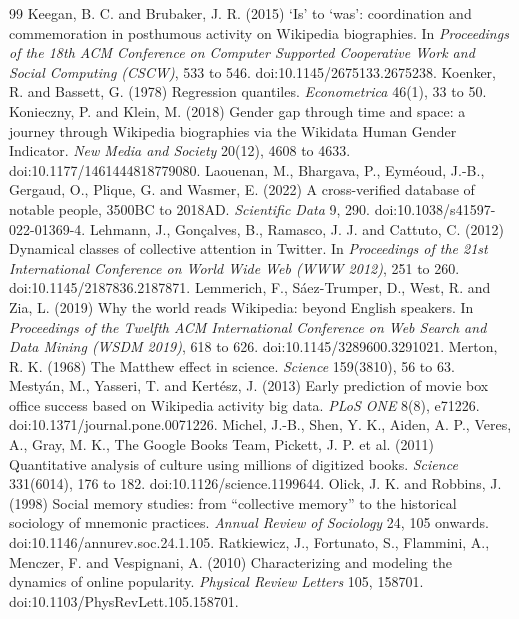\documentclass[11pt,a4paper]{article}
\begin{document}
\begin{thebibliography}{99}
 Keegan, B. C. and Brubaker, J. R. (2015) `Is' to `was': coordination and commemoration in posthumous activity on Wikipedia biographies. In \textit{Proceedings of the 18th ACM Conference on Computer Supported Cooperative Work and Social Computing (CSCW)}, 533 to 546. doi:10.1145/2675133.2675238.
 Koenker, R. and Bassett, G. (1978) Regression quantiles. \textit{Econometrica} 46(1), 33 to 50.
 Konieczny, P. and Klein, M. (2018) Gender gap through time and space: a journey through Wikipedia biographies via the Wikidata Human Gender Indicator. \textit{New Media and Society} 20(12), 4608 to 4633. doi:10.1177/1461444818779080.
 Laouenan, M., Bhargava, P., Eyméoud, J.-B., Gergaud, O., Plique, G. and Wasmer, E. (2022) A cross-verified database of notable people, 3500BC to 2018AD. \textit{Scientific Data} 9, 290. doi:10.1038/s41597-022-01369-4.
 Lehmann, J., Gonçalves, B., Ramasco, J. J. and Cattuto, C. (2012) Dynamical classes of collective attention in Twitter. In \textit{Proceedings of the 21st International Conference on World Wide Web (WWW 2012)}, 251 to 260. doi:10.1145/2187836.2187871.
 Lemmerich, F., Sáez-Trumper, D., West, R. and Zia, L. (2019) Why the world reads Wikipedia: beyond English speakers. In \textit{Proceedings of the Twelfth ACM International Conference on Web Search and Data Mining (WSDM 2019)}, 618 to 626. doi:10.1145/3289600.3291021.
 Merton, R. K. (1968) The Matthew effect in science. \textit{Science} 159(3810), 56 to 63.
 Mestyán, M., Yasseri, T. and Kertész, J. (2013) Early prediction of movie box office success based on Wikipedia activity big data. \textit{PLoS ONE} 8(8), e71226. doi:10.1371/journal.pone.0071226.
 Michel, J.-B., Shen, Y. K., Aiden, A. P., Veres, A., Gray, M. K., The Google Books Team, Pickett, J. P. et al. (2011) Quantitative analysis of culture using millions of digitized books. \textit{Science} 331(6014), 176 to 182. doi:10.1126/science.1199644.
 Olick, J. K. and Robbins, J. (1998) Social memory studies: from ``collective memory'' to the historical sociology of mnemonic practices. \textit{Annual Review of Sociology} 24, 105 onwards. doi:10.1146/annurev.soc.24.1.105.
 Ratkiewicz, J., Fortunato, S., Flammini, A., Menczer, F. and Vespignani, A. (2010) Characterizing and modeling the dynamics of online popularity. \textit{Physical Review Letters} 105, 158701. doi:10.1103/PhysRevLett.105.158701.

\end{thebibliography}
\end{document}
